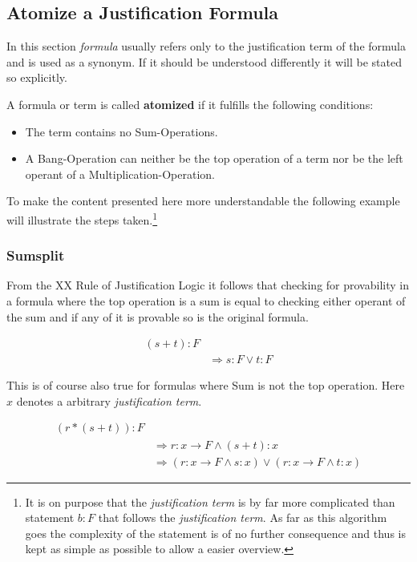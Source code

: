 \subsection{Atomize a Justification Formula}
In this section \emph{formula} usually refers only to the justification term of the formula and is used as a synonym. If it should be understood differently it will be stated so explicitly.
\begin{definition}[atomized]
	A formula or term is called \textbf{atomized} if it fulfills the following conditions:
	\begin{itemize}
		\item The term contains no Sum-Operations.
		\item A Bang-Operation can neither be the top operation of a term nor be the left operant of a Multiplication-Operation.
	\end{itemize}	
\end{definition}
To make the content presented here more understandable the following example will illustrate the steps taken.\footnote{It is on purpose that the \emph{justification term} is by far more complicated than statement $b:F$ that follows the \emph{justification term}. As far as this algorithm goes the complexity of the statement is of no further consequence and thus is kept as simple as possible to allow a easier overview.}

\subsubsection{Sumsplit}
\label{sumsplit}
From the XX Rule of Justification Logic it follows that checking for provability in a formula where the top operation is a sum is equal to checking either operant of the sum and if any of it is provable so is the original formula.

\begin{equation}\label{ss1}
\begin{split}
	(s+t):F \\
	& \Rightarrow s:F \lor t:F
\end{split}
\end{equation}




This is of course also true for formulas where Sum is not the top operation. Here $x$ denotes a arbitrary \emph{justification term}.

\begin{equation}\label{ss2}
\begin{split}
	(r*(s+t)):F  \\
	& \Rightarrow r: x \rightarrow F \land (s+t): x \\
	& \Rightarrow ( r: x \rightarrow F \land s: x ) \lor ( r: x \rightarrow F \land t: x )
\end{split}
\end{equation}

